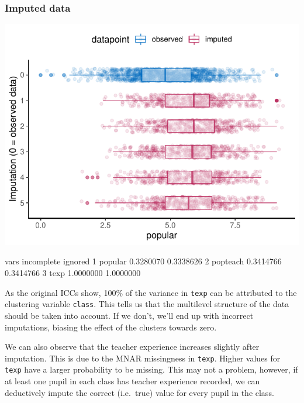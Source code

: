 \documentclass[
]{jss}
\begin{document}
\hypertarget{imputed-data}{%
\subsubsection{Imputed data}\label{imputed-data}}

\begin{CodeChunk}


\begin{center}\includegraphics{Manuscript_files/figure-latex/pop_ignored_eval-1} \end{center}

\begin{CodeOutput}
      vars incomplete   ignored
1  popular  0.3280070 0.3338626
2 popteach  0.3414766 0.3414766
3     texp  1.0000000 1.0000000
\end{CodeOutput}
\end{CodeChunk}

As the original ICCs show, 100\% of the variance in \texttt{texp} can be
attributed to the clustering variable \texttt{class}. This tells us that
the multilevel structure of the data should be taken into account. If we
don't, we'll end up with incorrect imputations, biasing the effect of
the clusters towards zero.

We can also observe that the teacher experience increases slightly after
imputation. This is due to the MNAR missingness in \texttt{texp}. Higher
values for \texttt{texp} have a larger probability to be missing. This
may not a problem, however, if at least one pupil in each class has
teacher experience recorded, we can deductively impute the correct
(i.e.~true) value for every pupil in the class.
\end{document}
